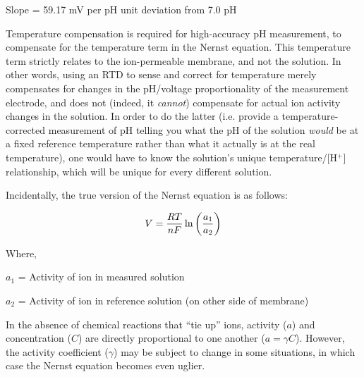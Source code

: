 \vskip 10pt

Slope = 59.17 mV per pH unit deviation from 7.0 pH

\vskip 10pt

Temperature compensation is required for high-accuracy pH measurement, to compensate for the temperature term in the Nernst equation.  This temperature term strictly relates to the ion-permeable membrane, and not the solution.  In other words, using an RTD to sense and correct for temperature merely compensates for changes in the pH/voltage proportionality of the measurement electrode, and does not (indeed, it {\it cannot}) compensate for actual ion activity changes in the solution.  In order to do the latter (i.e. provide a temperature-corrected measurement of pH telling you what the pH of the solution {\it would} be at a fixed reference temperature rather than what it actually is at the real temperature), one would have to know the solution's unique temperature/[H$^{+}$] relationship, which will be unique for every different solution.

\vskip 10pt

Incidentally, the true version of the Nernst equation is as follows:

$$V = {{R T} \over {nF}} \ln \left({a_1 \over a_2}\right)$$

\noindent
Where,

$a_1$ = Activity of ion in measured solution

$a_2$ = Activity of ion in reference solution (on other side of membrane)

\vskip 10pt

In the absence of chemical reactions that ``tie up'' ions, activity ($a$) and concentration ($C$) are directly proportional to one another ($a = \gamma C$).  However, the activity coefficient ($\gamma$) may be subject to change in some situations, in which case the Nernst equation becomes even uglier.











